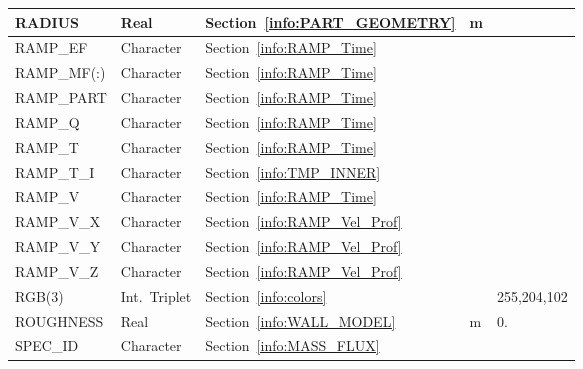 \documentclass[11pt]{book}
\begin{document}
\begin{longtable}{@{\extracolsep{\fill}}|l|l|l|l|l|}
{\ct RADIUS}                          & Real            & Section~\ref{info:PART_GEOMETRY}          & m                   &                         \\ \hline
{\ct RAMP\_EF}                        & Character       & Section~\ref{info:RAMP_Time}              &                     &                         \\ \hline
{\ct RAMP\_MF(:)}                     & Character       & Section~\ref{info:RAMP_Time}              &                     &                         \\ \hline
{\ct RAMP\_PART}                      & Character       & Section~\ref{info:RAMP_Time}              &                     &                         \\ \hline
{\ct RAMP\_Q}                         & Character       & Section~\ref{info:RAMP_Time}              &                     &                         \\ \hline
{\ct RAMP\_T}                         & Character       & Section~\ref{info:RAMP_Time}              &                     &                         \\ \hline
{\ct RAMP\_T\_I}                      & Character       & Section~\ref{info:TMP_INNER}              &                     &                         \\ \hline
{\ct RAMP\_V}                         & Character       & Section~\ref{info:RAMP_Time}              &                     &                         \\ \hline
{\ct RAMP\_V\_X}                      & Character       & Section~\ref{info:RAMP_Vel_Prof}          &                     &                         \\ \hline
{\ct RAMP\_V\_Y}                      & Character       & Section~\ref{info:RAMP_Vel_Prof}          &                     &                         \\ \hline
{\ct RAMP\_V\_Z}                      & Character       & Section~\ref{info:RAMP_Vel_Prof}          &                     &                         \\ \hline
{\ct RGB(3)}                          & Int.~Triplet    & Section~\ref{info:colors}                 &                     & \small 255,204,102      \\ \hline
{\ct ROUGHNESS}                       & Real            & Section~\ref{info:WALL_MODEL}             & m                   & 0.                      \\ \hline
{\ct SPEC\_ID}                        & Character       & Section~\ref{info:MASS_FLUX}              &                     &                         \\ \hline

\end{longtable}
\end{document}
